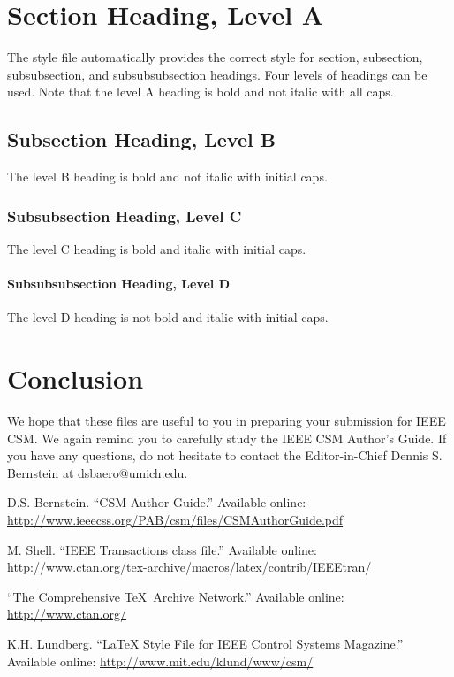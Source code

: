 \documentclass[letterpaper,12pt,peerreviewca,draftcls]{IEEEtran}
\begin{document}
\section{Section Heading, Level A}


The style file automatically provides the correct style for
section, subsection, subsubsection, and subsubsubsection headings.
Four levels of headings can be used.  Note that the level A
heading is bold and not italic with all caps.


\subsection{Subsection Heading, Level B}


The level B heading is bold and not italic with initial caps.


\subsubsection{Subsubsection Heading, Level C}


The level C heading is bold and italic with initial caps.


\paragraph{Subsubsubsection Heading, Level D}


The level D heading is not bold and italic with initial caps.






\section{Conclusion}


We hope that these files are useful to you in preparing your submission
for IEEE CSM.  We again remind you to carefully study the IEEE CSM
Author's Guide.  If you have any questions, do not hesitate to contact
the Editor-in-Chief Dennis S. Bernstein at dsbaero@umich.edu.



\newpage

\clearpage

\begin{thebibliography}{1}

D.S. Bernstein. ``CSM Author Guide.'' Available online:
\url{http://www.ieeecss.org/PAB/csm/files/CSMAuthorGuide.pdf}


M. Shell.  ``IEEE Transactions class file.''  Available online:
\url{http://www.ctan.org/tex-archive/macros/latex/contrib/IEEEtran/}


``The Comprehensive \TeX\ Archive Network.''
Available online: \url{http://www.ctan.org/}


K.H. Lundberg.  ``LaTeX Style File for IEEE Control Systems Magazine.''
Available online: \url{http://www.mit.edu/klund/www/csm/}

\end{thebibliography}
\end{document}
